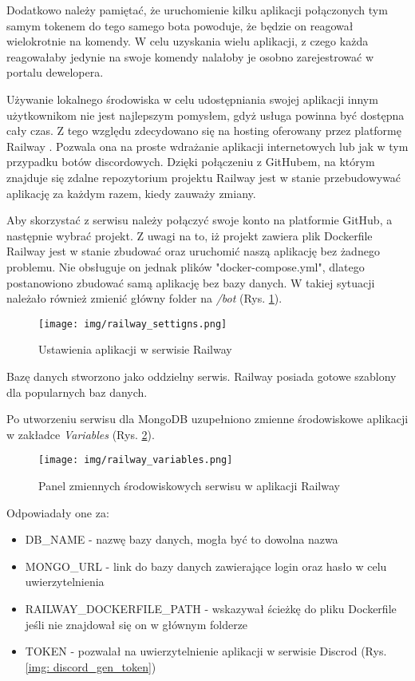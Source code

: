 \documentclass[11pt,a4paper]{article}
\begin{document}
Dodatkowo należy pamiętać, że uruchomienie kilku aplikacji połączonych tym samym tokenem do tego samego bota powoduje, że będzie on reagował wielokrotnie na komendy. W celu uzyskania wielu aplikacji, z czego każda reagowałaby jedynie na swoje komendy nalałoby je osobno zarejestrować w portalu dewelopera.

Używanie lokalnego środowiska w celu udostępniania swojej aplikacji innym użytkownikom nie jest najlepszym pomysłem, gdyż usługa powinna być dostępna cały czas. Z tego względu zdecydowano się na hosting oferowany przez platformę Railway \cite{Railway}. Pozwala ona na proste wdrażanie aplikacji internetowych lub jak w tym przypadku botów discordowych. Dzięki połączeniu z GitHubem, na którym znajduje się zdalne repozytorium projektu Railway jest w stanie przebudowywać aplikację za każdym razem, kiedy zauważy zmiany. 

Aby skorzystać z serwisu należy połączyć swoje konto na platformie GitHub, a następnie wybrać projekt. Z uwagi na to, iż projekt zawiera plik Dockerfile Railway jest w stanie zbudować oraz uruchomić naszą aplikację bez żadnego problemu. Nie obsługuje on jednak plików "docker-compose.yml", dlatego postanowiono zbudować samą aplikację bez bazy danych. W takiej sytuacji należało również zmienić główny folder na \textit{/bot} (Rys. \ref{fig: railway settings}). 

\begin{figure}[H]
    \centering
    \texttt{[image: img/railway\_settigns.png]}
    \caption{Ustawienia aplikacji w serwisie Railway}
    \label{fig: railway settings}
\end{figure}

Bazę danych stworzono jako oddzielny serwis. Railway posiada gotowe szablony dla popularnych baz danych.

Po utworzeniu serwisu dla MongoDB uzupełniono zmienne środowiskowe aplikacji w zakładce \textit{Variables} (Rys. \ref{fig: railway variables}).

\begin{figure}[H]
    \centering
    \texttt{[image: img/railway\_variables.png]}
    \caption{Panel zmiennych środowiskowych serwisu w aplikacji Railway}
    \label{fig: railway variables}
\end{figure}

Odpowiadały one za:
\begin{itemize}
    \item DB\_NAME - nazwę bazy danych, mogła być to dowolna nazwa
    \item MONGO\_URL - link do bazy danych zawierające login oraz hasło w celu uwierzytelnienia
    \item RAILWAY\_DOCKERFILE\_PATH - wskazywał ścieżkę do pliku Dockerfile jeśli nie znajdował się on w głównym folderze
    \item TOKEN - pozwalał na uwierzytelnienie aplikacji w serwisie Discrod (Rys. \ref{img: discord_gen_token})
\end{itemize}
\end{document}
